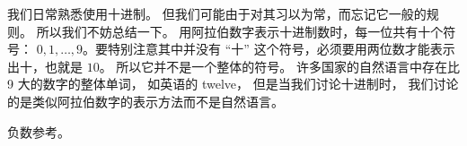 
\begin{issues}
\issueDraft
\end{issues}

我们日常熟悉使用十进制。 但我们可能由于对其习以为常，而忘记它一般的规则。 所以我们不妨总结一下。 用阿拉伯数字表示十进制数时，每一位共有十个符号： $0,1,\dots, 9$。要特别注意其中并没有 “十” 这个符号，必须要用两位数才能表示出十，也就是 $10$。 所以它并不是一个整体的符号。 许多国家的自然语言中存在比 9 大的数字的整体单词， 如英语的 twelve， 但是当我们讨论十进制时， 我们讨论的是类似阿拉伯数字的表示方法而不是自然语言。


负数参考。
